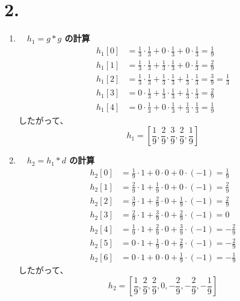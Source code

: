 \documentclass[11pt,a4paper]{jlreq}
\begin{document}
\section*{2.}

\begin{enumerate}
    \item[(A)] \textbf{\boldmath　$h_1 = g * g$ の計算} \\
\begin{align*}
    h_1[0] &= \frac{1}{3} \cdot \frac{1}{3} + 0 \cdot \frac{1}{3} + 0 \cdot \frac{1}{3} = \frac{1}{9} \\
    h_1[1] &= \frac{1}{3} \cdot \frac{1}{3} + \frac{1}{3} \cdot \frac{1}{3} + 0 \cdot \frac{1}{3} = \frac{2}{9} \\
    h_1[2] &= \frac{1}{3} \cdot \frac{1}{3} + \frac{1}{3} \cdot \frac{1}{3} + \frac{1}{3} \cdot \frac{1}{3} = \frac{3}{9} = \frac{1}{3} \\
    h_1[3] &= 0 \cdot \frac{1}{3} + \frac{1}{3} \cdot \frac{1}{3} + \frac{1}{3} \cdot \frac{1}{3} = \frac{2}{9} \\
    h_1[4] &= 0 \cdot \frac{1}{3} + 0 \cdot \frac{1}{3} + \frac{1}{3} \cdot \frac{1}{3} = \frac{1}{9}
\end{align*}
したがって、
\[
    \boxed{h_1 = \left[\frac{1}{9}, \frac{2}{9}, \frac{3}{9}, \frac{2}{9}, \frac{1}{9}\right]}
\]

    \item[(B)] \textbf{\boldmath　$h_2 = h_1 * d$ の計算} \\
\begin{align*}
    h_2[0] &= \frac{1}{9} \cdot 1 + 0 \cdot 0 + 0 \cdot (-1) = \frac{1}{9} \\
    h_2[1] &= \frac{2}{9} \cdot 1 + \frac{1}{9} \cdot 0 + 0 \cdot (-1) = \frac{2}{9} \\
    h_2[2] &= \frac{3}{9} \cdot 1 + \frac{2}{9} \cdot 0 + \frac{1}{9} \cdot (-1) = \frac{2}{9} \\
    h_2[3] &= \frac{2}{9} \cdot 1 + \frac{3}{9} \cdot 0 + \frac{2}{9} \cdot (-1) = 0 \\
    h_2[4] &= \frac{1}{9} \cdot 1 + \frac{2}{9} \cdot 0 + \frac{3}{9} \cdot (-1) = -\frac{2}{9} \\
    h_2[5] &= 0 \cdot 1 + \frac{1}{9} \cdot 0 + \frac{2}{9} \cdot (-1) = -\frac{2}{9} \\
    h_2[6] &= 0 \cdot 1 + 0 \cdot 0 + \frac{1}{9} \cdot (-1) = -\frac{1}{9}
\end{align*}
したがって、
\[
    \boxed{h_2 = \left[\frac{1}{9}, \frac{2}{9}, \frac{2}{9}, 0, -\frac{2}{9}, -\frac{2}{9}, -\frac{1}{9}\right]}
\]


\end{enumerate}
\end{document}
